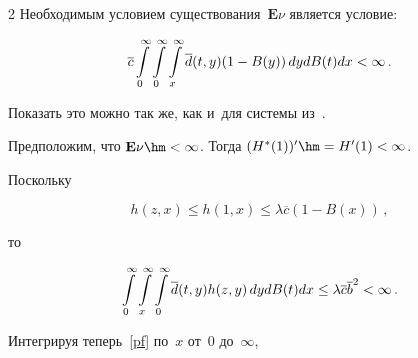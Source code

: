 \begin{multicols}{2}
Необходимым условием существования~$\mathbf{E}\nu$ является условие:





\pagebreak











\noindent


\begin{equation}


\label{sred}


\overline{c}


\int\limits_0^\infty


\int\limits_0^\infty


\int\limits_x^\infty


\d(t,y)


(1-B(y)) \,dy  dB(t)


dx < \infty\,.


\end{equation}








\noindent Показать это можно так же, как и~для системы из~\cite{n3}.


Предположим, что $\mathbf{E}\nu\hm< \infty$. Тогда $(H^*(1))'\hm=H'(1)<\infty$.


Поскольку


\begin{equation}


\label{hzx}


h(z,x)\le h(1,x)\le \lambda \overline{c} (1-B(x)) \,,


\end{equation}


то


$$


\int\limits_0^\infty


\int\limits_x^\infty


\int\limits_0^\infty


\d(t,y) h(z,y) \, dy 


dB(t) dx


\le \lambda  \overline{c}  \overline{b}^2 < \infty\,.


$$





\noindent Интегрируя теперь~\eqref{pf} по~$x$ от~0 до~$\infty$,



\end{multicols}
